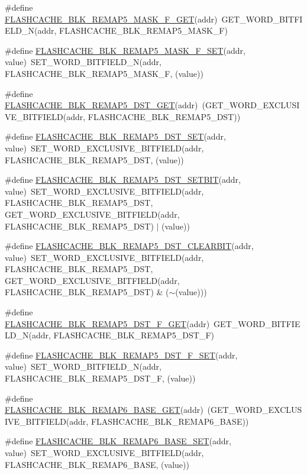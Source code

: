 \begin{DoxyCompactItemize}
\item 
\#define \hyperlink{a00549_a70e5d2d6fa996a9b0ab01a81a9287a55}{FLASHCACHE\_\-BLK\_\-REMAP5\_\-MASK\_\-F\_\-GET}(addr)~GET\_\-WORD\_\-BITFIELD\_\-N(addr, FLASHCACHE\_\-BLK\_\-REMAP5\_\-MASK\_\-F)
\item 
\#define \hyperlink{a00549_a0e684b6b9d2723d8377d74e4992e7a65}{FLASHCACHE\_\-BLK\_\-REMAP5\_\-MASK\_\-F\_\-SET}(addr, value)~SET\_\-WORD\_\-BITFIELD\_\-N(addr, FLASHCACHE\_\-BLK\_\-REMAP5\_\-MASK\_\-F, (value))
\item 
\#define \hyperlink{a00549_abe553e83634db46253b38ca19f60e524}{FLASHCACHE\_\-BLK\_\-REMAP5\_\-DST\_\-GET}(addr)~(GET\_\-WORD\_\-EXCLUSIVE\_\-BITFIELD(addr, FLASHCACHE\_\-BLK\_\-REMAP5\_\-DST))
\item 
\#define \hyperlink{a00549_a7e2f9ff43c88285fcdca6fa9b437c22f}{FLASHCACHE\_\-BLK\_\-REMAP5\_\-DST\_\-SET}(addr, value)~SET\_\-WORD\_\-EXCLUSIVE\_\-BITFIELD(addr, FLASHCACHE\_\-BLK\_\-REMAP5\_\-DST, (value))
\item 
\#define \hyperlink{a00549_a56bd4795af3453820e37e0f1a165d59a}{FLASHCACHE\_\-BLK\_\-REMAP5\_\-DST\_\-SETBIT}(addr, value)~SET\_\-WORD\_\-EXCLUSIVE\_\-BITFIELD(addr, FLASHCACHE\_\-BLK\_\-REMAP5\_\-DST, GET\_\-WORD\_\-EXCLUSIVE\_\-BITFIELD(addr, FLASHCACHE\_\-BLK\_\-REMAP5\_\-DST) $|$ (value))
\item 
\#define \hyperlink{a00549_a9c2c651126552a3c2e3281eec90f2207}{FLASHCACHE\_\-BLK\_\-REMAP5\_\-DST\_\-CLEARBIT}(addr, value)~SET\_\-WORD\_\-EXCLUSIVE\_\-BITFIELD(addr, FLASHCACHE\_\-BLK\_\-REMAP5\_\-DST, GET\_\-WORD\_\-EXCLUSIVE\_\-BITFIELD(addr, FLASHCACHE\_\-BLK\_\-REMAP5\_\-DST) \& ($\sim$(value)))
\item 
\#define \hyperlink{a00549_a438f0358712c789ae097190c6c078337}{FLASHCACHE\_\-BLK\_\-REMAP5\_\-DST\_\-F\_\-GET}(addr)~GET\_\-WORD\_\-BITFIELD\_\-N(addr, FLASHCACHE\_\-BLK\_\-REMAP5\_\-DST\_\-F)
\item 
\#define \hyperlink{a00549_a277e03f93ff72e4531d2468aaa6fa637}{FLASHCACHE\_\-BLK\_\-REMAP5\_\-DST\_\-F\_\-SET}(addr, value)~SET\_\-WORD\_\-BITFIELD\_\-N(addr, FLASHCACHE\_\-BLK\_\-REMAP5\_\-DST\_\-F, (value))
\item 
\#define \hyperlink{a00549_a76498632ada8f41399a07f140a1b14f2}{FLASHCACHE\_\-BLK\_\-REMAP6\_\-BASE\_\-GET}(addr)~(GET\_\-WORD\_\-EXCLUSIVE\_\-BITFIELD(addr, FLASHCACHE\_\-BLK\_\-REMAP6\_\-BASE))
\item 
\#define \hyperlink{a00549_afc13cdbdafb4da7b09d422512e0f879d}{FLASHCACHE\_\-BLK\_\-REMAP6\_\-BASE\_\-SET}(addr, value)~SET\_\-WORD\_\-EXCLUSIVE\_\-BITFIELD(addr, FLASHCACHE\_\-BLK\_\-REMAP6\_\-BASE, (value))

\end{DoxyCompactItemize}
